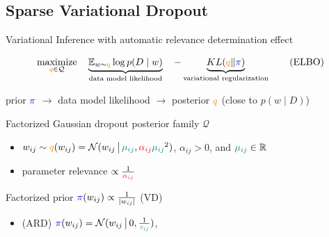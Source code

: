 \documentclass{beamer}
\newcommand{\real}{\mathbb{R}}
\begin{document}
\subsection{Sparse Variational Dropout {\tiny \citep{molchanov_variational_2017}}} %
\label{sub:sparse_variational_dropout}

\begin{frame}[c]{\insertsubsection}{\insertsection}
  Variational Inference with automatic relevance determination effect


  \begin{equation}
    \label{eq:elbo}
    \underset{
      {\color{orange} q} \in \mathcal{Q}
    }{\text{maximize}}
    \quad
    \underbrace{
      \mathbb{E}_{w \sim {\color{orange} q}}
          \log p(D\mid w)  %
    }_{
      \text{data model likelihood}
    }
    \quad
    - \underbrace{
      \mathop{KL}({\color{orange} q}\|{\color{blue} \pi})
    }_{
      \text{variational regularization}
    }
    \tag{ELBO}
  \end{equation}

  \medskip
  prior ${\color{blue} \pi}$
    $\to$ data model likelihood
    $\to$ posterior ${\color{orange} q}$
    (close to $p(w \mid D)$)
  
  \bigskip
  Factorized Gaussian dropout posterior family $\mathcal{Q}$
  \begin{itemize}
    \item $
      w_{ij} \sim {\color{orange} q}(w_{ij})
        = \mathcal{N}(
          w_{ij}\,\big\vert\,
          {\color{teal} \mu_{ij}},
          {\color{red} \alpha_{ij}}
            {\color{teal} \mu_{ij}}^2
        )
    $, $\alpha_{ij} > 0$, and ${\color{teal} \mu_{ij}} \in \real$
    \item parameter relevance $\propto \frac1{{\color{red} \alpha_{ij}}}$
  \end{itemize}

  \smallskip
  Factorized prior $
    {\color{blue} \pi}(w_{ij})
      \propto \frac1{\lvert w_{ij}\rvert}
  $ (VD)
  \begin{itemize}
    \item (ARD) $
      {\color{blue} \pi}(w_{ij}) = \mathcal{N}(
        w_{ij}\,\big\vert\,
        0, \tfrac1{{\color{teal} \tau_{ij}}}
      )
    $, \citep{kharitonov_variational_2018}
  \end{itemize}
\end{frame}
\end{document}
